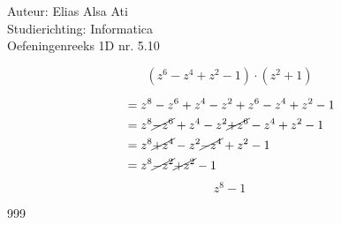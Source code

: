 \documentclass[a4paper]{article}
\begin{document}
\noindent \large Auteur: Elias Alsa Ati                         \\
\noindent \large Studierichting: Informatica                    \\
\noindent \large Oefeningenreeks 1D nr. 5.10    \\

\medskip

\normalsize

$$\left(z^6 - z^4 + z^2 - 1\right) \cdot \left(z^2 + 1\right)$$

\begin{align*}
    &= z^8 - z^6 + z^4 - z^2 + z^6 - z^4 + z^2 - 1                      \\
    &= z^8 \cancel{- z^6} + z^4 - z^2 \cancel{+ z^6} - z^4 + z^2 - 1    \\
    &= z^8 \cancel{+ z^4} - z^2 \cancel{- z^4} + z^2 - 1                \\
    &= z^8 \cancel{- z^2} \cancel{+ z^2} - 1                            \\
\end{align*}
$$ z^8 - 1$$

\begin{thebibliography}{999}
\end{thebibliography}
\end{document}
